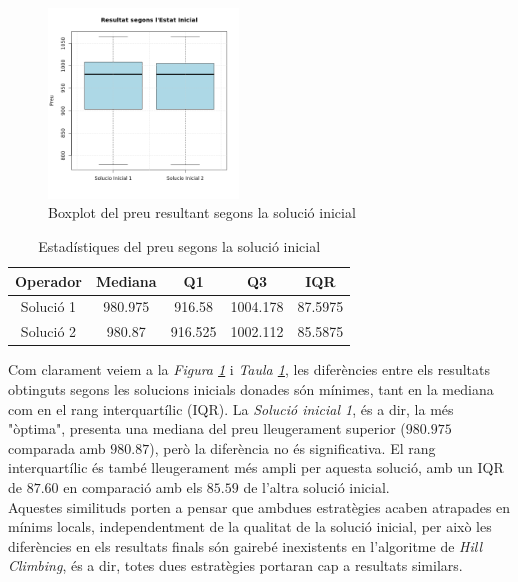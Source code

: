 \documentclass[a4paper]{article}
\begin{document}
	\begin{figure}[H]
		\centering
		\includegraphics[width=0.45\textwidth]{images/exp2_boxplot.png}
		\caption{Boxplot del preu resultant segons la solució inicial}
		\label{fig:exp2_boxplot}
	\end{figure}
	
	\begin{table}[H]
		\centering
		\begin{tabular}{|c|c|c|c|c|}
			\hline
			\textbf{Operador} & \textbf{Mediana} & \textbf{Q1} & \textbf{Q3} & \textbf{IQR} \\
			\hline
			Solució 1 & 980.975 & 916.58 & 1004.178 & 87.5975 \\
			\hline
			Solució 2 & 980.87 & 916.525 & 1002.112 & 85.5875 \\
			\hline
		\end{tabular}
		\caption{Estadístiques del preu segons la solució inicial}
		\label{tab:exp2_estadisticas}
	\end{table}
	
	Com clarament veiem a la \textit{Figura \ref{fig:exp2_boxplot}} i \textit{Taula \ref{tab:exp2_estadisticas}}, les diferències entre els resultats obtinguts segons les solucions inicials donades són mínimes, tant en la mediana com en el rang interquartílic (IQR). La \textit{Solució inicial 1}, és a dir, la més "òptima", presenta una mediana del preu lleugerament superior ($980.975$ comparada amb $980.87$), però la diferència no és significativa. El rang interquartílic és també lleugerament més ampli per aquesta solució, amb un IQR de $87.60$ en comparació amb els $85.59$ de l'altra solució inicial.\\
	
	Aquestes similituds porten a pensar que ambdues estratègies acaben atrapades en mínims locals, independentment de la qualitat de la solució inicial, per això les diferències en els resultats finals són gairebé inexistents en l'algoritme de \textit{Hill Climbing}, és a dir, totes dues estratègies portaran cap a resultats similars.\\
	
\end{document}
